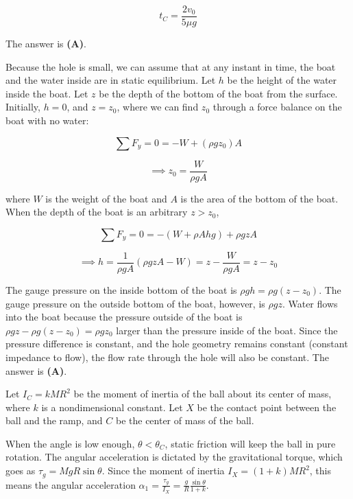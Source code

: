 \documentclass[12pt]{article}
\begin{document}
$$t_C = \frac{2 v_0}{5 \mu g}$$

The answer is \textbf{(A)}.


\vspace{2 \baselineskip}



Because the hole is small, we can assume that at any instant in time, the boat and the water inside are in static equilibrium. Let $h$ be the height of the water inside the boat. Let $z$ be the depth of the bottom of the boat from the surface. Initially, $h = 0$, and $z = z_0$, where we can find $z_0$ through a force balance on the boat with no water:

$$\sum F_y = 0 = -W + (\rho g z_0) A$$

$$\implies z_0 = \frac{W}{\rho g A}$$

where $W$ is the weight of the boat and $A$ is the area of the bottom of the boat. When the depth of the boat is an arbitrary $z > z_0$,

$$\sum F_y = 0 = -(W + \rho A h g) + \rho g z A$$

$$\implies h = \frac{1}{\rho g A} (\rho g z A - W) = z - \frac{W}{\rho g A} = z - z_0$$

The gauge pressure on the inside bottom of the boat is $\rho g h = \rho g (z - z_0)$. The gauge pressure on the outside bottom of the boat, however, is $\rho g z$. Water flows into the boat because the pressure outside of the boat is $\rho g z - \rho g (z - z_0) = \rho g z_0$ larger than the pressure inside of the boat. Since the pressure difference is constant, and the hole geometry remains constant (constant impedance to flow), the flow rate through the hole will also be constant. The answer is \textbf{(A)}.


\vspace{2 \baselineskip}



Let $I_C = k M R^2$ be the moment of inertia of the ball about its center of mass, where $k$ is a nondimensional constant. Let $X$ be the contact point between the ball and the ramp, and $C$ be the center of mass of the ball.

When the angle is low enough, $\theta < \theta_C$, static friction will keep the ball in pure rotation. The angular acceleration is dictated by the gravitational torque, which goes as $\tau_g = M g R \sin \theta$. Since the moment of inertia $I_X = (1 + k) M R^2$, this means the angular acceleration $\alpha_1 = \frac{\tau_g}{I_X} = \frac{g}{R} \frac{\sin \theta}{1 + k}$.
\end{document}
